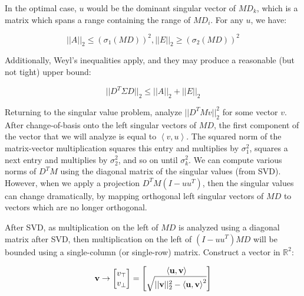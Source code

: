 \documentclass{article}
\def\tang{\ThisStyle{\abovebaseline[0pt]{\scalebox{-1}{$\SavedStyle\perp$}}}}
\begin{document}
In the optimal case, $u$ would be the dominant singular vector of $MD_k$, which is a matrix which spans a range containing the range of $MD_i$. For any $u$, we have:

$$
||A||_2 \le \left(\sigma_1(MD)\right)^2,
||E||_2 \ge \left(\sigma_2(MD)\right)^2
$$

Additionally, Weyl's inequalities apply, and they may produce a reasonable (but not tight) upper bound:

$$
||D^T \Sigma D||_2 \le ||A||_2 + ||E||_2
$$

Returning to the singular value problem, analyze $||D^TM v||_2^2$ for some vector $v$. After change-of-basis onto the left singular vectors of $MD$, the first component of the vector that we will analyze is equal to $\left< v, u \right>$. The squared norm of the matrix-vector multiplication squares this entry and multiplies by $\sigma_1^2$, squares a next entry and multiplies by $\sigma_2^2$, and so on until $\sigma_k^2$. We can compute various norms of $D^TM$ using the diagonal matrix of the singular values (from SVD). However, when we apply a projection $D^TM(I-uu^T)$, then the singular values can change dramatically, by mapping orthogonal left singular vectors of $MD$ to vectors which are no longer orthogonal.

After SVD, as multiplication on the left of $MD$ is analyzed using a diagonal matrix after SVD, then multiplication on the left of $(I-uu^T)MD$ will be bounded using a single-column (or single-row) matrix. Construct a vector in $\mathbb{R}^2$:

$$\mathbf{v} \to \left[
    \begin{matrix}
        v_{\tang} \\ v_\perp
    \end{matrix}
\right]
=\left[
    \begin{matrix}
        \left<\mathbf{u},\mathbf{v}\right>
        \\
        \sqrt{||\mathbf{v}||_2^2 -
        \left<\mathbf{u},\mathbf{v}\right>^2}
    \end{matrix}
\right]
$$
\end{document}
